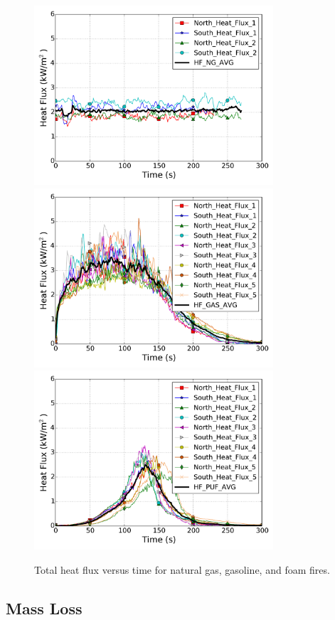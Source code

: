 \documentclass[twoside]{uocthesis}
\begin{document}
{\begin{figure}[p]
  \centering
  \includegraphics[width=3.5in]{../Figures/HF_NG}\\
  \includegraphics[width=3.5in]{../Figures/HF_GAS}\\
  \includegraphics[width=3.5in]{../Figures/HF_PUF}\\
  \caption[Total heat flux versus time for natural gas, gasoline, and foam fires]{Total heat flux versus time for natural gas, gasoline, and foam fires.}
  \label{Flux}
\end{figure}


\subsection{Mass Loss}

}
\end{document}

